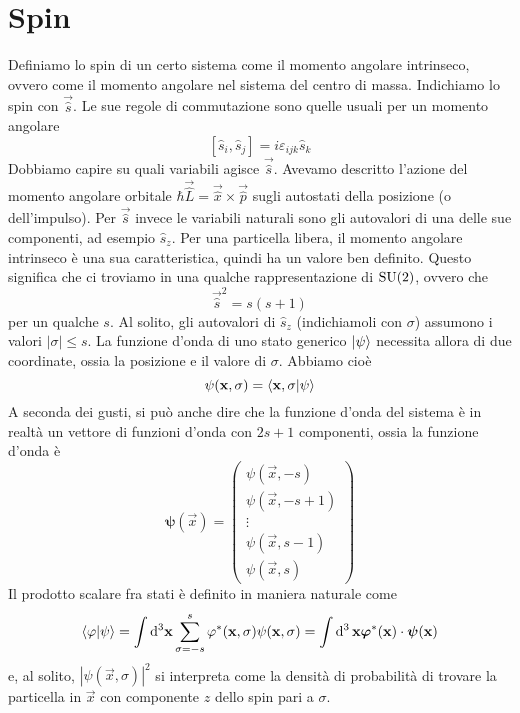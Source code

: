 \documentclass[a4paper, 11pt]{article}
\newcommand{\op}{\hat}
\newcommand{\Op}[1]{\vec{\hat{#1}}}
\newcommand{\1}{\mathbbm{1}}
\begin{document}
	\section{Spin}
	Definiamo lo spin di un certo sistema come il momento angolare intrinseco, ovvero come il momento angolare nel sistema del centro di massa. Indichiamo lo spin con $\Op{s}$. Le sue regole di commutazione sono quelle usuali per un momento angolare
	\[[\op s_i,\op s_j]=i\varepsilon_{ijk}\op s_k\]
	Dobbiamo capire su quali variabili agisce $\Op{s}$. Avevamo descritto l'azione  del momento angolare orbitale $\hbar\Op L=\Op x\times\Op p$ sugli autostati della posizione (o dell'impulso). Per $\Op s$ invece le variabili naturali sono gli autovalori di una delle sue componenti, ad esempio $\op s_z$. Per una particella libera, il momento angolare intrinseco è una sua caratteristica, quindi ha un valore ben definito. Questo significa che ci troviamo in una qualche rappresentazione di $\mathrm{SU}(2)$, ovvero che
	\[\Op s^2=s(s+1)\]
	per un qualche $s$. Al solito, gli autovalori di $\op s_z$ (indichiamoli con $\sigma$) assumono i valori $|\sigma|\leq s$. La funzione d'onda di uno stato generico $\left| \psi\right\rangle$ necessita allora di due coordinate, ossia la posizione e il valore di $\sigma$. Abbiamo cioè
	\[\psi(\mathbf{x},\sigma)=\langle \mathbf{x},\sigma\vert\psi\rangle\]
	A seconda dei gusti, si può anche dire che la funzione d'onda del sistema è in realtà un vettore di funzioni d'onda con $2s+1$ componenti, ossia la funzione d'onda è
	\[\bm\psi(\vec{x})=\left(\begin{array}{c}
	\psi(\vec{x},-s)\\\psi(\vec{x},-s+1)\\\vdots\\\psi(\vec{x},s-1)\\\psi(\vec{x},s)
	\end{array}\right)\]
	Il prodotto scalare fra stati è definito in maniera naturale come
	\[\langle \varphi\vert\psi\rangle=\int\mathrm{d} ^3\mathbf{x}\sum_{\sigma=-s}^s\varphi^*(\mathbf{x},\sigma)\psi(\mathbf{x},\sigma)=\int\mathrm{d} ^3\,\mathbf{x}\bm\varphi^*(\mathbf{x})\cdot\bm\psi(\mathbf{x})\]
	e, al solito, $|\psi(\vec{x},\sigma)|^2$ si interpreta come la densità di probabilità di trovare la particella in $\vec{x}$ con componente $z$ dello spin pari a $\sigma$.
\end{document}
